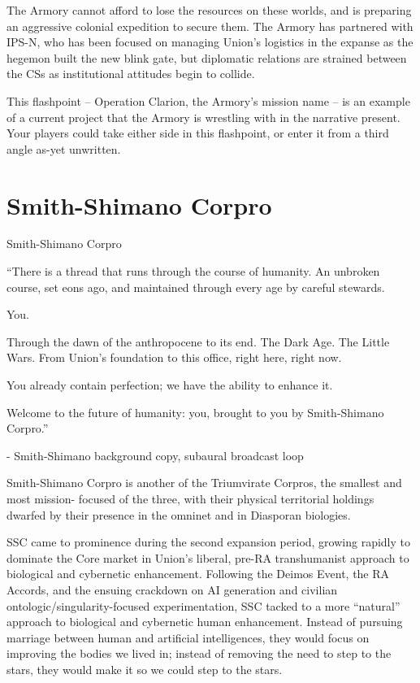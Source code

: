 The Armory cannot afford to lose the resources on these worlds, and is preparing an aggressive  
colonial expedition to secure them. The Armory has partnered with IPS-N, who has been focused  
on managing Union’s logistics in the expanse as the hegemon built the new blink gate, but  
diplomatic relations are strained between the CSs as institutional attitudes begin to collide.
 

This flashpoint -- Operation Clarion, the Armory’s mission name -- is an example of a current  
project that the Armory is wrestling with in the narrative present. Your players could take either  
side in this flashpoint, or enter it from a third angle as-yet unwritten. 
 
\section{Smith-Shimano Corpro}
Smith-Shimano Corpro  

         “There is a thread that runs through the course of humanity. An unbroken course,  
         set eons ago, and maintained through every age by careful stewards.   

         You.   

         Through the dawn of the anthropocene to its end. The Dark Age. The Little Wars.  
         From Union’s foundation to this office, right here, right now.   

         You already contain perfection; we have the ability to enhance it.   

         Welcome to the future of humanity: you, brought to you by Smith-Shimano Corpro.”    

             -   Smith-Shimano background copy, subaural broadcast loop  

                                                                                                            


Smith-Shimano Corpro is another of the Triumvirate Corpros, the smallest and most mission- 
focused of the three, with their physical territorial holdings dwarfed by their presence in the  
omninet and in Diasporan biologies. 
 

SSC came to prominence during the second expansion period, growing rapidly to dominate the  
Core market in Union’s liberal, pre-RA transhumanist approach to biological and cybernetic  
enhancement. Following the Deimos Event, the RA Accords, and the ensuing crackdown on AI  
generation and civilian ontologic/singularity-focused experimentation, SSC tacked to a more  
“natural” approach to biological and cybernetic human enhancement. Instead of pursuing  
marriage between human and artificial intelligences, they would focus on improving the bodies  
we lived in; instead of removing the need to step to the stars, they would make it so we could  
step to the stars. 
 

